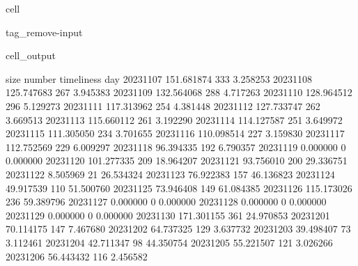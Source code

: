\documentclass[letterpaper,10pt,english]{jupyterBook}
\begin{document}
\begin{sphinxuseclass}{cell}
\begin{sphinxuseclass}{tag_remove-input}\begin{sphinxVerbatimOutput}

\begin{sphinxuseclass}{cell_output}
\begin{sphinxVerbatim}[commandchars=\\\{\}]
                  size  number  timeliness
day                                       
2023\PYGZhy{}11\PYGZhy{}07  151.681874     333    3.258253
2023\PYGZhy{}11\PYGZhy{}08  125.747683     267    3.945383
2023\PYGZhy{}11\PYGZhy{}09  132.564068     288    4.717263
2023\PYGZhy{}11\PYGZhy{}10  128.964512     296    5.129273
2023\PYGZhy{}11\PYGZhy{}11  117.313962     254    4.381448
2023\PYGZhy{}11\PYGZhy{}12  127.733747     262    3.669513
2023\PYGZhy{}11\PYGZhy{}13  115.660112     261    3.192290
2023\PYGZhy{}11\PYGZhy{}14  114.127587     251    3.649972
2023\PYGZhy{}11\PYGZhy{}15  111.305050     234    3.701655
2023\PYGZhy{}11\PYGZhy{}16  110.098514     227    3.159830
2023\PYGZhy{}11\PYGZhy{}17  112.752569     229    6.009297
2023\PYGZhy{}11\PYGZhy{}18   96.394335     192    6.790357
2023\PYGZhy{}11\PYGZhy{}19    0.000000       0    0.000000
2023\PYGZhy{}11\PYGZhy{}20  101.277335     209   18.964207
2023\PYGZhy{}11\PYGZhy{}21   93.756010     200   29.336751
2023\PYGZhy{}11\PYGZhy{}22    8.505969      21   26.534324
2023\PYGZhy{}11\PYGZhy{}23   76.922383     157   46.136823
2023\PYGZhy{}11\PYGZhy{}24   49.917539     110   51.500760
2023\PYGZhy{}11\PYGZhy{}25   73.946408     149   61.084385
2023\PYGZhy{}11\PYGZhy{}26  115.173026     236   59.389796
2023\PYGZhy{}11\PYGZhy{}27    0.000000       0    0.000000
2023\PYGZhy{}11\PYGZhy{}28    0.000000       0    0.000000
2023\PYGZhy{}11\PYGZhy{}29    0.000000       0    0.000000
2023\PYGZhy{}11\PYGZhy{}30  171.301155     361   24.970853
2023\PYGZhy{}12\PYGZhy{}01   70.114175     147    7.467680
2023\PYGZhy{}12\PYGZhy{}02   64.737325     129    3.637732
2023\PYGZhy{}12\PYGZhy{}03   39.498407      73    3.112461
2023\PYGZhy{}12\PYGZhy{}04   42.711347      98   44.350754
2023\PYGZhy{}12\PYGZhy{}05   55.221507     121    3.026266
2023\PYGZhy{}12\PYGZhy{}06   56.443432     116    2.456582
\end{sphinxVerbatim}

\end{sphinxuseclass}\end{sphinxVerbatimOutput}

\end{sphinxuseclass}
\end{sphinxuseclass}
\sphinxstepscope
\end{document}
